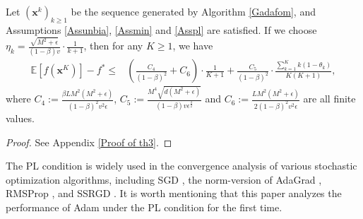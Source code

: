 \documentclass[twoside,11pt]{article}
\begin{document}
\begin{theorem}\label{th3}
Let $(\mathbf{x}^k)_{k\ge 1}$ be the sequence generated by Algorithm \ref{Gadafom}, and Assumptions \ref{Assunbia}, \ref{Assmin} and \ref{Asspl} are satisfied. If we choose $\eta_k=\frac{\sqrt{M^2+\epsilon}}{(1-\beta)v}\cdot\frac{1}{k+1}$, then for any $K\ge 1$, we have
\begin{equation}
	\begin{aligned}
		\mathbb{E}\left[ f(\mathbf{x}^{K})\right] -f^*
		\le
		&\left( \frac{C_4}{(1-\beta)^2}+C_6\right) \cdot\frac{ 1 }{K+1} +\frac{C_5}{(1-\beta)^2}\cdot\frac{\sum_{k=1}^{K}k(1-\theta_k)}{K(K+1)} ,\nonumber
	\end{aligned}
\end{equation}
where $C_4:=\frac{\beta LM^2(M^2+\epsilon)}{(1-\beta)^2 v^2\epsilon}$, $
C_5:=\frac{ M^4\sqrt{d(M^2+\epsilon)}}{(1-\beta)v\epsilon^{\frac{3}{2}}}$ and $
C_6:=\frac{LM^2(M^2+\epsilon)}{2(1-\beta)^2 v^2\epsilon}$ are all finite values.
\end{theorem}
\begin{proof}
See Appendix \ref{Proof of th3}.
\end{proof}

\par The PL condition is widely used in the convergence analysis of various stochastic optimization algorithms, including SGD  \citep{bassily2018exponential},  the norm-version of AdaGrad \citep{xie2020linear}, RMSProp \citep{sun2020novel}, and SSRGD \citep{li2022simple}. It is worth mentioning that this paper analyzes the performance of Adam under the PL condition for the first time.
\end{document}
